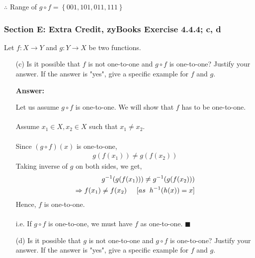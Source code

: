\documentclass[14pt]{extreport}
\newcommand{\answer}[0]{\medskip \textbf{Answer:} \medskip}
\begin{document}
\begin{enumerate}
        $\therefore$ Range of $g \circ f = \left \{ 001, 101, 011, 111 \right \}$

\end{enumerate}
	
\subsubsection*{Section E: Extra Credit, zyBooks Exercise 4.4.4; c, d}

Let \( f: X \rightarrow Y \) and \( g: Y \rightarrow X \) be two functions.
	
\begin{enumerate}

    \item[(c)] Is it possible that \( f \) is not one-to-one and \( g \circ f \) is one-to-one? Justify your answer. If the answer is "yes", give a specific example for \( f \) and \( g \).
    
        \answer

        Let us assume $g \circ f$ is one-to-one. We will show that $f$ has to be one-to-one. \\\\
        Assume $x_{1} \in X, x_{2} \in X$ such that $x_{1} \neq x_{2}$. \\\\
        Since $\left ( g \circ f \right )\left ( x \right )$ is one-to-one,
        \begin{align*}
            g(f(x_{1})) \neq g(f(x_{2}))
        \end{align*}
        Taking inverse of $g$ on both sides, we get,
        \begin{align*}
            g^{-1}(g(f(x_1))) \neq g^{-1}(g(f(x_2)))\\
            \Rightarrow f(x_1) \neq f(x_2) \hspace{5mm}[as \hspace{2mm} h^{-1}(h(x)) = x]
        \end{align*}
        Hence, $f$ is one-to-one. \\\\
        i.e. If $g \circ f$ is one-to-one, we must have $f$ as one-to-one. $\blacksquare$ 

    \newpage
        
    \item[(d)] Is it possible that \( g \) is not one-to-one and \( g \circ f \) is one-to-one? Justify your answer. If the answer is "yes", give a specific example for \( f \) and \( g \).
    

\end{enumerate}
\end{document}
